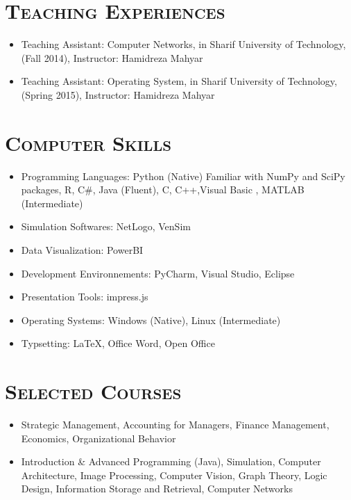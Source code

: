 \documentclass[line,margin]{res}
\begin{document}
\begin{resume}
\begin{spacing}{1.1}
\section{\textsc{Teaching Experiences}}
\begin{itemize}
\item  Teaching Assistant: Computer Networks, in Sharif University of Technology, (Fall 2014), Instructor:
Hamidreza Mahyar
\item Teaching Assistant: Operating System, in Sharif University of Technology, (Spring 2015), Instructor:
Hamidreza Mahyar
\end{itemize}

\section{\textsc{Computer
Skills}}
\begin{itemize}
\item  Programming Languages: Python (Native) Familiar with NumPy and SciPy packages, R, C\#, Java (Fluent), C, C++,Visual Basic , MATLAB (Intermediate)
\item Simulation Softwares: NetLogo, VenSim
\item Data Visualization: PowerBI
\item Development Environnements: PyCharm, Visual Studio, Eclipse
\item Presentation Tools: impress.js %
\item  Operating Systems: Windows (Native), Linux (Intermediate)
\item Typsetting: \LaTeX  , Office Word, Open Office
\end{itemize}

\section{\textsc{Selected Courses}}
\begin{itemize}
\item Strategic Management, Accounting for Managers, Finance Management, Economics, Organizational Behavior 
\item Introduction \& Advanced Programming (Java), Simulation, Computer Architecture, Image Processing, Computer Vision, 	Graph Theory, Logic Design, Information Storage and Retrieval, Computer Networks
\end{itemize}


\end{spacing}
\end{resume}
\end{document}
